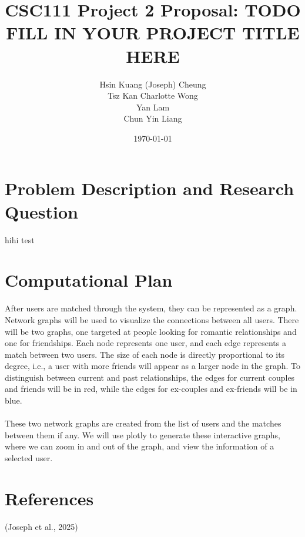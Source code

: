 \documentclass[fontsize=11pt]{article}
\title{CSC111 Project 2 Proposal: TODO FILL IN YOUR PROJECT TITLE HERE}
\author{Hsin Kuang (Joseph) Cheung \\ Tsz Kan Charlotte Wong \\ Yan Lam \\ Chun Yin Liang}
\date{\today}
\begin{document}
\maketitle

\section*{Problem Description and Research Question}

hihi
test

\section*{Computational Plan}

After users are matched through the system, they can be represented as a graph. Network graphs will be used to visualize the connections between all users. There will be two graphs, one targeted at people looking for romantic relationships and one for friendships. Each node represents one user, and each edge represents a match between two users. The size of each node is directly proportional to its degree, i.e., a user with more friends will appear as a larger node in the graph. To distinguish between current and past relationships, the edges for current couples and friends will be in red, while the edges for ex-couples and ex-friends will be in blue.
\\
\\
These two network graphs are created from the list of users and the matches between them if any. We will use plotly to generate these interactive graphs, where we can zoom in and out of the graph, and view the information of a selected user.

\section*{References}

(Joseph et al., 2025)

\end{document}
